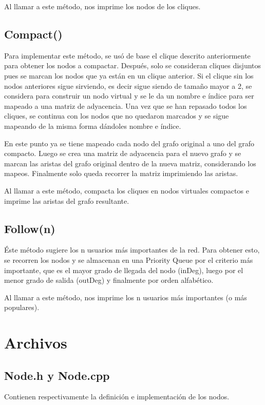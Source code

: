 \documentclass[12pt]{article}
\begin{document}
Al llamar a este método, nos imprime los nodos de los cliques.

\subsection{Compact()}

\indent\indent Para implementar este método, se usó de base el clique descrito anteriormente para obtener los nodos a compactar. Después, solo se consideran cliques disjuntos pues se marcan los nodos que ya están en un clique anterior. Si el clique sin los nodos anteriores sigue sirviendo, es decir sigue siendo de tamaño mayor a 2, se considera para construir un nodo virtual y se le da un nombre e índice para ser mapeado a una matriz de adyacencia. Una vez que se han repasado todos los cliques, se continua con los nodos que no quedaron marcados y se sigue mapeando de la misma forma dándoles nombre e índice. 

En este punto ya se tiene mapeado cada nodo del grafo original a uno del grafo compacto. Luego se crea una matriz de adyacencia para el nuevo grafo y se marcan las aristas del grafo original dentro de la nueva matriz, considerando los mapeos. Finalmente solo queda recorrer la matriz imprimiendo las aristas.

Al llamar a este método, compacta los cliques en nodos virtuales compactos e imprime las aristas del grafo resultante.

\subsection{Follow(n)}

Éste método sugiere los n usuarios más importantes de la red.
Para obtener esto, se recorren los nodos y se almacenan en una Priority Queue por el criterio más importante, que es el mayor grado de llegada del nodo (inDeg), luego por el menor grado de salida (outDeg) y finalmente por orden alfabético.

Al llamar a este método, nos imprime los n usuarios más importantes (o más populares).

\newpage
\section{Archivos}
\subsection{Node.h y Node.cpp}
Contienen respectivamente la definición e implementación de los nodos.
\end{document}
